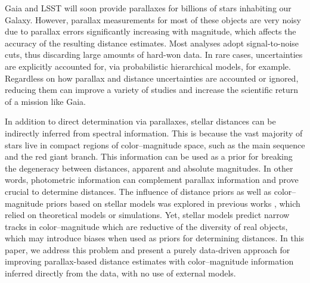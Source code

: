 \documentclass[manuscript, letterpaper]{aastex6}
\makeatletter
\let\origsection\section
\renewcommand\section{\@ifstar{\starsection}{\nostarsection}}
\newcommand\nostarsection[1]{\sectionprelude\origsection{#1}}
\newcommand\starsection[1]{\sectionprelude\origsection*{#1}}
\newcommand\sectionprelude{\vspace{1em}}
\newcommand{\eg}{{\textit{e.g.},~}}
\makeatother
\begin{document}
\newpage
\section{Introduction}

Gaia and LSST will soon provide parallaxes for billions of stars inhabiting our Galaxy.
However, parallax measurements for most of these objects are very noisy due to parallax errors significantly increasing with magnitude, which affects the accuracy of the resulting distance estimates.
Most analyses adopt signal-to-noise cuts, thus discarding large amounts of hard-won data. 
In rare cases, uncertainties are explicitly accounted for, via probabilistic hierarchical models, for example.
Regardless on how parallax and distance uncertainties are accounted or ignored, reducing them can improve a variety of studies and increase the scientific return of a mission like Gaia.

In addition to direct determination via parallaxes, stellar distances can be indirectly inferred from spectral information.
This is because the vast majority of stars live in compact regions of color--magnitude space, such as the main sequence and the red giant branch.
This information can be used as a prior for breaking the degeneracy between distances, apparent and absolute magnitudes.
In other words, photometric information can complement parallax information and prove crucial to determine distances.
The influence of distance priors as well as color--magnitude priors based on stellar models was explored in previous works \citep[\eg][]{Astraatmadja22016, Astraatmadja2016}, which relied on theoretical models or simulations.
Yet, stellar models predict narrow tracks in color--magnitude which are reductive of the diversity of real objects, which may introduce biases when used as priors for determining distances.
In this paper, we address this problem and present a purely data-driven approach for improving parallax-based distance estimates with color--magnitude information inferred directly from the data, with no use of external models. 
\end{document}
